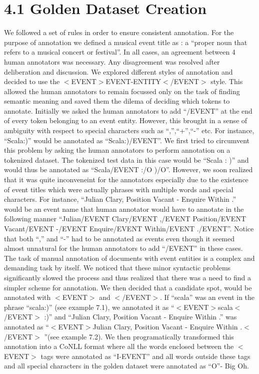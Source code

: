 \documentclass[a4paper,11pt]{report}
\begin{document}
\section*{4.1 Golden Dataset Creation}
We followed a set of rules in order to ensure consistent annotation. For the purpose of annotation we defined a musical event title as : a ``proper noun that refers to a musical concert or festival''. In all cases, an agreement between 4 human annotators was necessary. Any disagreement was resolved after deliberation and discussion. We explored different styles of annotation and decided to use the $<$EVENT$>$EVENT-ENTITY$<$/EVENT$>$ style. This allowed the human annotators to remain focussed only on the task of finding semantic meaning and saved them the dilema of deciding which tokens to annotate. Initially we asked the human annotators to add ``/EVENT'' at the end of every token belonging to an event entity. However, this brought in a sense of ambiguity with respect to special characters such as ``,'',``+'',``-'' etc. For instance, ``Scala:)'' would be annotated as ``Scala:)/EVENT''. We first tried to circumvent this problem by asking the human annotators to perform annotation on a tokenized dataset. The tokenized test data in this case would be ``Scala : )'' and would thus be annotated as ``Scala/EVENT :/O )/O''. However, we soon realized that it was quite inconveneint for the annotators especially due to the existence of event titles which were actually phrases with multiple words and special characters. For instance, ``Julian Clary, Position Vacant - Enquire Within .'' would be an event name that human annotator would have to annotate in the following manner ``Julian/EVENT Clary/EVENT ,/EVENT Position/EVENT Vacant/EVENT -/EVENT Enquire/EVENT Within/EVENT ./EVENT''. Notice that both ``,'' and ``-'' had to be annotated as events even though it seemed almost unnatural for the human annotators to add ``/EVENT'' in these cases. The task of manual annotation of documents with event entities is a complex and demanding task by itself. We noticed that these minor syntactic problems significantly slowed the process and thus realized that there was a need to find a simpler scheme for annotation. We then decided that a candidate spot, would be annotated with $<$EVENT$>$ and $<$/EVENT$>$. If ``scala'' was an event in the phrase ``scala:)'' (see example 7.1), we annotated it as ``$<$EVENT$>$scala$<$/EVENT$>$ :)'' and ``Julian Clary, Position Vacant - Enquire Within .'' was annotated as ``$<$EVENT$>$Julian Clary, Position Vacant - Enquire Within .$<$/EVENT$>$ ''(see example 7.2). We then programatically transformed this annotation into a CoNLL format where all the words enclosed between the $<$EVENT$>$ tags were annotated as ``I-EVENT'' and all words outside these tags and all special characters in the golden dataset were annotated as ``O''- Big Oh. \newline
\end{document}
